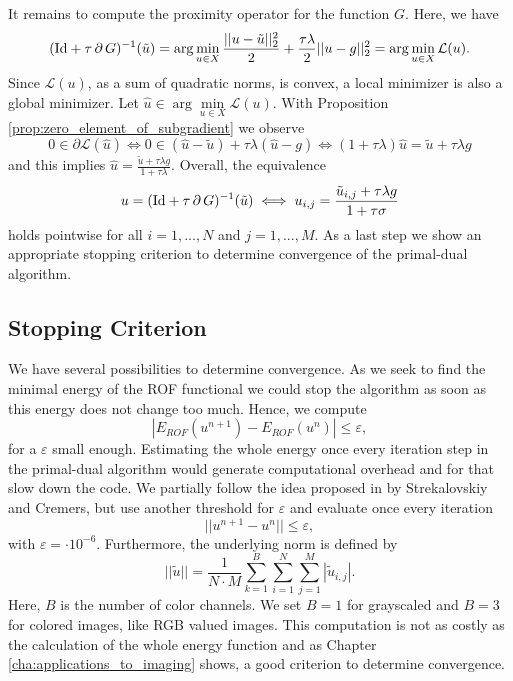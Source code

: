 \documentclass[abstracton]{scrreprt}
\begin{document}
            It remains to compute the proximity operator for the function $G$. Here, we have
                $$
                    (\textnormal{Id} + \tau\,\partial\,G)^{-1}(\tilde{u}) = \arg \min_{u \in X} \frac{||u - \tilde{u}||_{2}^{2}}{2} + \frac{\tau\lambda}{2} ||u - g||_{2}^{2} = \arg \min_{u \in X} \mathcal{L}(u).
                $$
            Since $\mathcal{L}(u)$, as a sum of quadratic norms, is convex, a local minimizer is also a global minimizer. Let $\hat{u} \in \arg \min\limits_{u \in X} \mathcal{L}(u)$. With Proposition \ref{prop:zero_element_of_subgradient} we observe
                $$
                    0 \in \partial \mathcal{L}(\hat{u}) \iff 0 \in (\hat{u} - \tilde{u}) + \tau\lambda (\hat{u} - g) \iff (1 + \tau\lambda)\hat{u} = \tilde{u} + \tau\lambda g
                $$
            and this implies $\hat{u} = \frac{\tilde{u} + \tau\lambda g}{1 + \tau\lambda}$. Overall, the equivalence
                \begin{equation}
                    u = (\textnormal{Id} + \tau\,\partial\,G)^{-1}(\tilde{u}) \iff u_{i,j} = \frac{\tilde{u}_{i,j} + \tau\lambda g}{1 + \tau\sigma}
                \label{eq:proximity_operator_g_rof}
                \end{equation}
            holds pointwise for all $i = 1, ..., N$ and $j = 1, ..., M$. As a last step we show an appropriate stopping criterion to determine convergence of the primal-dual algorithm.

        \subsection{Stopping Criterion} %
        \label{sub:stopping_criterion_rof}

            We have several possibilities to determine convergence. As we seek to find the minimal energy of the ROF functional we could stop the algorithm as soon as this energy does not change too much. Hence, we compute
                $$
                    |E_{ROF}(u^{n+1}) - E_{ROF}(u^{n})| \le \varepsilon,
                $$
             for a $\varepsilon$ small enough. Estimating the whole energy once every iteration step in the primal-dual algorithm would generate computational overhead and for that slow down the code. We partially follow the idea proposed in \cite{Strekalovskiy-Cremers-eccv14} by Strekalovskiy and Cremers, but use another threshold for $\varepsilon$ and evaluate once every iteration
                $$
                    ||u^{n+1} - u^{n}|| \le \varepsilon,
                $$
            with $\varepsilon = \cdot 10^{-6}$. Furthermore, the underlying norm is defined by
                $$
                    ||\tilde{u}|| = \frac{1}{N \cdot M} \sum_{k = 1}^{B} \sum_{i = 1}^{N} \sum_{j = 1}^{M} |\tilde{u}_{i,j}|.
                $$
            Here, $B$ is the number of color channels. We set $B = 1$ for grayscaled and $B = 3$ for colored images, like RGB valued images. This computation is not as costly as the calculation of the whole energy function and as Chapter \ref{cha:applications_to_imaging} shows, a good criterion to determine convergence.
\end{document}
